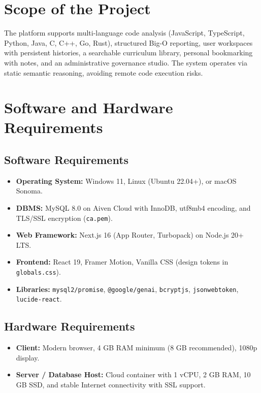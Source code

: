 \documentclass[12pt,a4paper]{report}
\DeclareRobustCommand{\_}{\textunderscore\allowbreak}
\begin{document}
\section{Scope of the Project}
The platform supports multi-language code analysis (JavaScript, TypeScript, Python, Java, C, C++, Go, Rust), structured Big-O reporting, user workspaces with persistent histories, a searchable curriculum library, personal bookmarking with notes, and an administrative governance studio. The system operates via static semantic reasoning, avoiding remote code execution risks.

\section{Software and Hardware Requirements}

\subsection{Software Requirements}
\begin{itemize}
    \item \textbf{Operating System:} Windows 11, Linux (Ubuntu 22.04+), or macOS Sonoma.
    \item \textbf{DBMS:} MySQL 8.0 on Aiven Cloud with InnoDB, utf8mb4 encoding, and TLS/SSL encryption (\texttt{ca.pem}).
    \item \textbf{Web Framework:} Next.js 16 (App Router, Turbopack) on Node.js 20+ LTS.
    \item \textbf{Frontend:} React 19, Framer Motion, Vanilla CSS (design tokens in \texttt{globals.css}).
    \item \textbf{Libraries:} \texttt{mysql2/promise}, \texttt{@google/genai}, \texttt{bcryptjs}, \texttt{jsonwebtoken}, \texttt{lucide-react}.
\end{itemize}

\subsection{Hardware Requirements}
\begin{itemize}
    \item \textbf{Client:} Modern browser, 4 GB RAM minimum (8 GB recommended), 1080p display.
    \item \textbf{Server / Database Host:} Cloud container with 1 vCPU, 2 GB RAM, 10 GB SSD, and stable Internet connectivity with SSL support.
\end{itemize}
\end{document}
